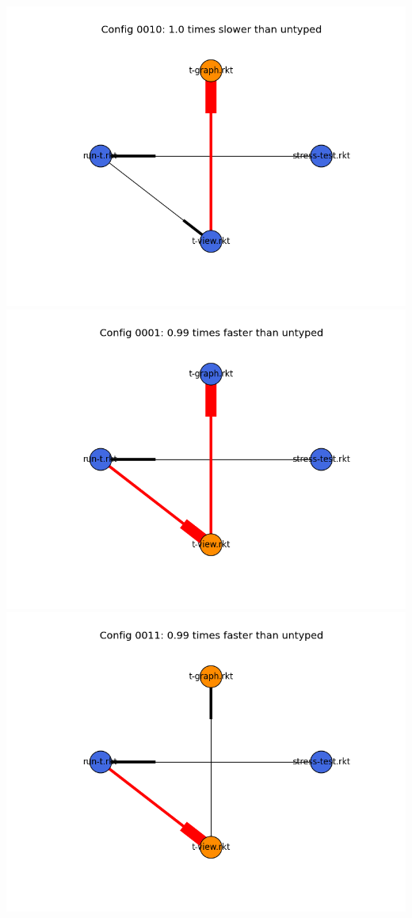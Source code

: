 \documentclass{article}
\begin{document}
\includegraphics[width=\textwidth]{mbta-04-20-asumu-module-graph-0010.png}
\includegraphics[width=\textwidth]{mbta-04-20-asumu-module-graph-0001.png}
\includegraphics[width=\textwidth]{mbta-04-20-asumu-module-graph-0011.png}
\end{document}
